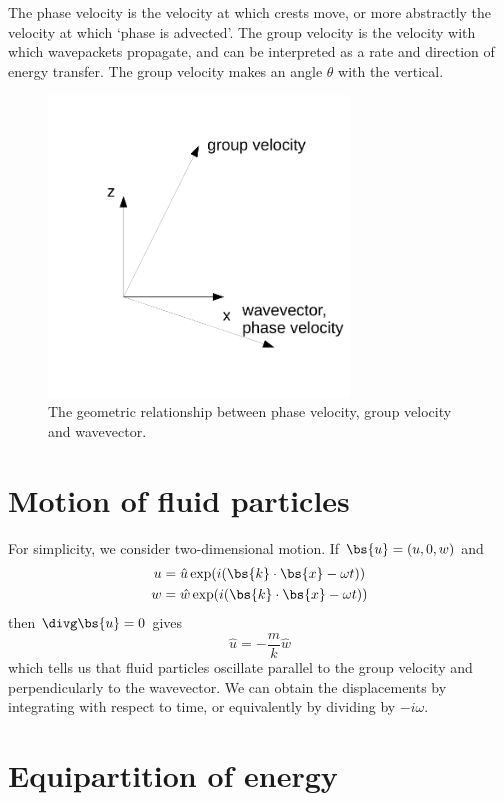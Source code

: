 The phase velocity is the velocity at which crests move, or more abstractly the
velocity at which `phase is advected'. The group velocity is the velocity with
which wavepackets propagate, and can be interpreted as a rate and direction of
energy transfer. The group velocity makes an angle $\theta$ with the vertical. 

\begin{figure}
\begin{center}
	\includegraphics[width=8cm]{igw-wave-vels.pdf}
	\caption{The geometric relationship between phase velocity, group velocity and wavevector.}
	\label{fig:igw-wave-vels}
\end{center}
\end{figure}

\section{Motion of fluid particles}

For simplicity, we consider two-dimensional motion. If $\bs{u} = (u,0,w)$ and 
\begin{align}
	u&=\hat{u} \exp(i(\bs{k}\cdot\bs{x} - \omega t)) \\
	w&=\hat{w} \exp(i(\bs{k}\cdot\bs{x} - \omega t)) \\
\end{align}
then $\divg\bs{u}=0$ gives
\begin{equation}
	\hat{u} = -\frac{m}{k}\hat{w}
\end{equation}
which tells us that fluid particles oscillate parallel to the group velocity and
perpendicularly to the wavevector. We can obtain the displacements by
integrating with respect to time, or equivalently by dividing by $-i\omega$. 

\section{Equipartition of energy}

